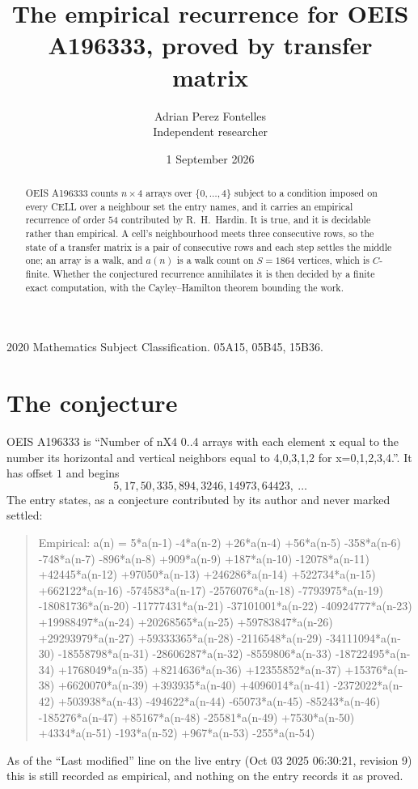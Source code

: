 \documentclass[11pt,a4paper]{article}
\title{The empirical recurrence for OEIS A196333, proved by transfer matrix}
\author{Adrian Perez Fontelles\\ \small Independent researcher}
\date{1 September 2026}
\theoremstyle{plain}
\theoremstyle{definition}
\begin{document}
\maketitle

\begin{abstract}
OEIS A196333 counts $n\times4$ arrays over $\{0,\dots,4\}$ subject to a condition imposed on
every CELL over a neighbour set the entry names, and it carries an empirical recurrence of
order $54$ contributed by R.~H.~Hardin. It is true, and it is decidable rather than
empirical. A cell's neighbourhood meets three consecutive rows, so the state of a transfer
matrix is a pair of consecutive rows and each step settles the middle one; an array is a
walk, and $a(n)$ is a walk count on $S=1864$ vertices, which is $C$-finite. Whether the
conjectured recurrence annihilates it is then decided by a finite exact computation, with the
Cayley--Hamilton theorem bounding the work.
\end{abstract}

\noindent\small 2020 Mathematics Subject Classification. 05A15, 05B45, 15B36.\normalsize

\section{The conjecture}

OEIS A196333 is ``Number of nX4 0..4 arrays with each element x equal to the number its horizontal and vertical neighbors equal to 4,0,3,1,2 for x=0,1,2,3,4.''. It has offset $1$ and begins
\[
5, 17, 50, 335, 894, 3246, 14973, 64423,\ \dots
\]
The entry states, as a conjecture contributed by its author and never marked settled:
\begin{quote}
Empirical: a(n) = 5*a(n-1) -4*a(n-2) +26*a(n-4) +56*a(n-5) -358*a(n-6) -748*a(n-7) -896*a(n-8) +909*a(n-9) +187*a(n-10) -12078*a(n-11) +42445*a(n-12) +97050*a(n-13) +246286*a(n-14) +522734*a(n-15) +662122*a(n-16) -574583*a(n-17) -2576076*a(n-18) -7793975*a(n-19) -18081736*a(n-20) -11777431*a(n-21) -37101001*a(n-22) -40924777*a(n-23) +19988497*a(n-24) +20268565*a(n-25) +59783847*a(n-26) +29293979*a(n-27) +59333365*a(n-28) -2116548*a(n-29) -34111094*a(n-30) -18558798*a(n-31) -28606287*a(n-32) -8559806*a(n-33) -18722495*a(n-34) +1768049*a(n-35) +8214636*a(n-36) +12355852*a(n-37) +15376*a(n-38) +6620070*a(n-39) +393935*a(n-40) +4096014*a(n-41) -2372022*a(n-42) +503938*a(n-43) -494622*a(n-44) -65073*a(n-45) -85243*a(n-46) -185276*a(n-47) +85167*a(n-48) -25581*a(n-49) +7530*a(n-50) +4334*a(n-51) -193*a(n-52) +967*a(n-53) -255*a(n-54)
\end{quote}
As of the ``Last modified'' line on the live entry (Oct 03 2025 06:30:21, revision 9) this is still
recorded as empirical, and nothing on the entry records it as proved.
\end{document}
